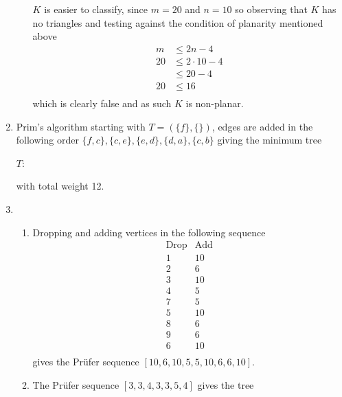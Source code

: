 \documentclass[10pt]{article}
\begin{document}
\begin{enumerate}
\begin{enumerate}
                    $K$ is easier to classify, since $m = 20$ and $n = 10$ so
                    observing that $K$ has no triangles and testing against the
                    condition of planarity mentioned above
                    \begin{align*}
                        m &\leq 2n - 4 \\
                        20 &\leq 2 \cdot 10 - 4 \\
                           &\leq 20 - 4 \\
                        20 &\leq 16 \\
                    \end{align*}
                    which is clearly false and as such $K$ is non-planar.
            \end{enumerate}
        \item Prim's algorithm starting with $T = (\{f\}, \{\})$, edges are
            added in  the following order $\{f, c\}, \{c, e\}, \{e, d\}, \{d,
            a\}, \{c, b\}$ giving the minimum tree

            $T$:  with total weight 12.
        \item
            \begin{enumerate}
                \item Dropping and adding vertices in the following sequence
                    $$
                    \begin{array}{c|c}
                        \text{Drop} & \text{Add} \\
                        \hline
                        1 & 10 \\
                        2 & 6 \\
                        3 & 10 \\
                        4 & 5 \\
                        7 & 5 \\
                        5 & 10 \\
                        8 & 6 \\
                        9 & 6 \\
                        6 & 10 \\
                    \end{array}
                    $$
                    gives the Pr{\"u}fer sequence $[10, 6, 10, 5, 5, 10, 6, 6, 10]$.
                \item The Pr{\"u}fer sequence $[3,3,4,3,3,5,4]$ gives the tree


\end{enumerate}
\end{enumerate}
\end{document}
